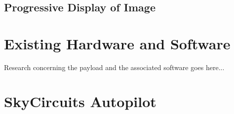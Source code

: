 \subsection{Progressive Display of Image}

\section{Existing Hardware and Software}
Research concerning the payload and the associated software goes here...

\section{SkyCircuits Autopilot}


